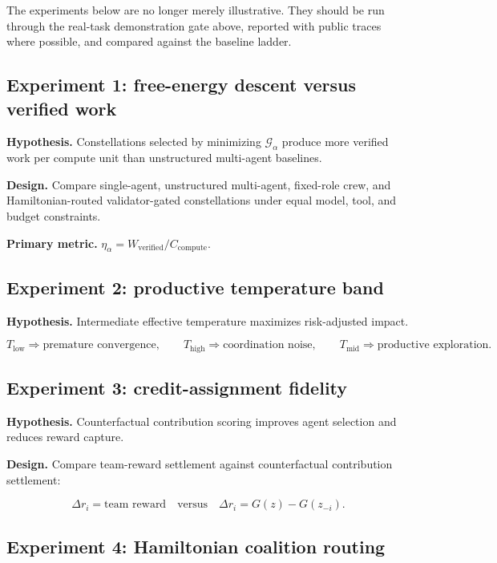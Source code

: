 \documentclass[11pt]{article}
\begin{document}
The experiments below are no longer merely illustrative. They should be
run through the real-task demonstration gate above, reported with public
traces where possible, and compared against the baseline ladder.

\subsection{Experiment 1: free-energy descent versus verified
work}\label{experiment-1-free-energy-descent-versus-verified-work}

\textbf{Hypothesis.} Constellations selected by minimizing
\(\mathcal{G}_{\alpha}\) produce more verified work per compute unit
than unstructured multi-agent baselines.

\textbf{Design.} Compare single-agent, unstructured multi-agent,
fixed-role crew, and Hamiltonian-routed validator-gated constellations
under equal model, tool, and budget constraints.

\textbf{Primary metric.}
\(\eta_{\alpha}=W_{\mathrm{verified}}/C_{\mathrm{compute}}\).

\subsection{Experiment 2: productive temperature
band}\label{experiment-2-productive-temperature-band}

\textbf{Hypothesis.} Intermediate effective temperature maximizes
risk-adjusted impact.

\[
T_{\mathrm{low}}\Rightarrow\text{premature convergence},
\qquad
T_{\mathrm{high}}\Rightarrow\text{coordination noise},
\qquad
T_{\mathrm{mid}}\Rightarrow\text{productive exploration}.
\]

\subsection{Experiment 3: credit-assignment
fidelity}\label{experiment-3-credit-assignment-fidelity}

\textbf{Hypothesis.} Counterfactual contribution scoring improves agent
selection and reduces reward capture.

\textbf{Design.} Compare team-reward settlement against counterfactual
contribution settlement:

\[
\Delta r_i=\text{team reward}
\quad\text{versus}\quad
\Delta r_i=G(z)-G(z_{-i}).
\]

\subsection{Experiment 4: Hamiltonian coalition
routing}\label{experiment-4-hamiltonian-coalition-routing}
\end{document}
